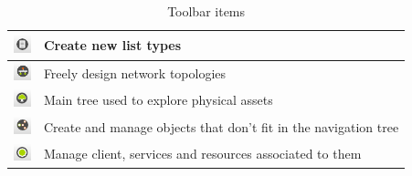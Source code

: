 \documentclass[a4paper]{article}
\begin{document}
\begin{table}[h!]
\begin{tabular}{cl}
			\midrule
			\includegraphics[width=0.5cm]{img/icon_list_type_manager.png} & Create new list types\\
			\midrule
			\includegraphics[width=0.5cm]{img/icon_topology_designer.png} & Freely design network topologies\\
			\midrule
			\includegraphics[width=0.5cm]{img/icon_navigation_tree.png} & Main tree used to explore physical assets\\
			\midrule
			\includegraphics[width=0.5cm]{img/icon_pools_manager.png} & Create and manage objects that don't fit in the navigation tree\\
			\midrule
			\includegraphics[width=0.5cm]{img/icon_service_manager.png} & Manage client, services and resources associated to them\\
		\end{tabular}	
		\caption{Toolbar items}
	\end{table}
	
	\newpage
\end{document}
